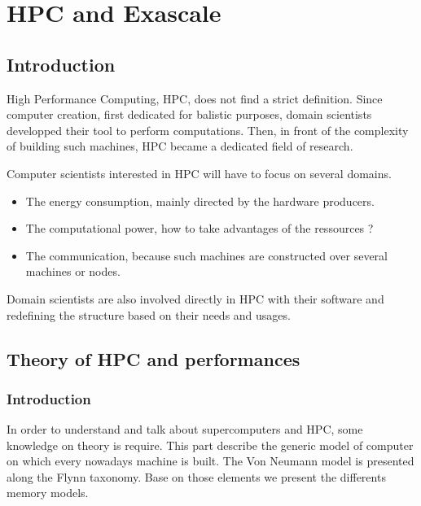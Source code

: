 \part{HPC and Exascale}
\chapter*{Introduction}

High Performance Computing, HPC, does not find a strict definition. 
Since computer creation, first dedicated for balistic purposes, domain scientists developped their tool to perform computations. 
Then, in front of the complexity of building such machines, HPC became a dedicated field of research. 

Computer scientists interested in HPC will have to focus on several domains. 
\begin{itemize}
\item The energy consumption, mainly directed by the hardware producers. 
\item The computational power, how to take advantages of the ressources ? 
\item The communication, because such machines are constructed over several machines or nodes. 
\end{itemize}

Domain scientists are also involved directly in HPC with their software and redefining the structure based on their needs and usages. 


\chapter{Theory of HPC and performances}

\section{Introduction}

In order to understand and talk about supercomputers and HPC, some knowledge on theory is require. 
This part describe the generic model of computer on which every nowadays machine is built.
The Von Neumann model is presented along the Flynn taxonomy. 
Base on those elements we present the differents memory models. 



